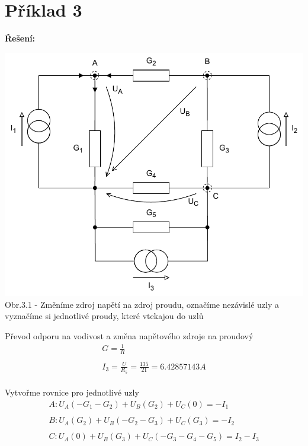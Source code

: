 \section{Příklad 3}

\large{\textbf{Řešení:}}

\begin{center}
    \includegraphics[scale=0.8,keepaspectratio]{fig/solutions/03-sol/03-step1.pdf} \\
    Obr.3.1 - Změníme zdroj napětí na zdroj proudu, označíme nezávislé uzly a vyznačíme si jednotlivé proudy, které vtekajou do uzlů
\end{center}

\noindent Převod odporu na vodivost a změna napětového zdroje na proudový
\begin{gather*}
    G = \frac{1}{R}\\\\
    I_3 = \frac{U}{R_5} = \frac{135}{21} = 6.42857143A
\end{gather*}
\\

Vytvořme rovnice pro jednotlivé uzly
\begin{gather*}
    A: U_A(-G_1 - G_2) + U_B(G_2) + U_C(0) = -I_1 \\\\
    B: U_A(G_2) + U_B(-G_2 - G_3) + U_C(G_3) = -I_2 \\\\
    C: U_A(0) + U_B(G_3) + U_C(-G_3 - G_4 - G_5) = I_2 - I_3
\end{gather*}

